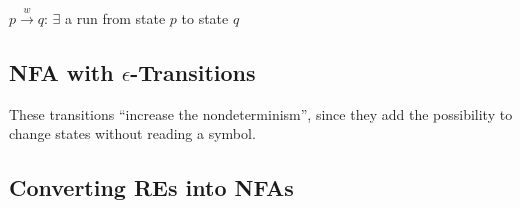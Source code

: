 \documentclass[a3paper, 8pt]{extarticle}
\begin{document}
\begin{multicols*}{6}
    $p \overset{w}{\to}q$: $\exists$ a run from state $p$ to state $q$

\subsection{NFA with $\epsilon$-Transitions}
These transitions “increase the nondeterminism”, since they add the possibility to change states without reading a symbol.

\subsection{Converting REs into NFAs}
    





\end{multicols*}
\end{document}
